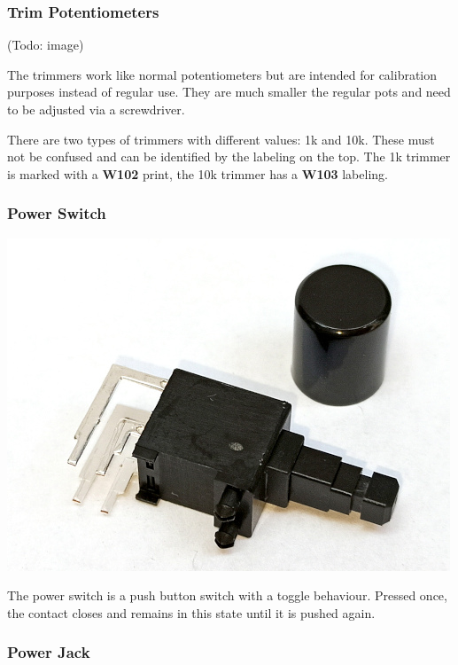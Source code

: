 \documentclass{scrartcl}
\begin{document}
\subsubsection{Trim Potentiometers}

\begin{center}
    (Todo: image)
\end{center}

The trimmers work like normal potentiometers but are intended for calibration purposes instead of regular use. They are much smaller the regular pots and need to be adjusted via a screwdriver.

There are two types of trimmers with different values: 1k and 10k. These must not be confused and can be identified by the labeling on the top. The 1k trimmer is marked with a \textbf{W102} print, the 10k trimmer has a \textbf{W103} labeling.

\subsubsection{Power Switch}

\begin{center}
    \includegraphics[scale=0.5]{assets/zekit-powerswitch-resized.jpg}
\end{center}

The power switch is a push button switch with a toggle behaviour. Pressed once, the contact closes and remains in this state until it is pushed again.

\subsubsection{Power Jack}
\end{document}

